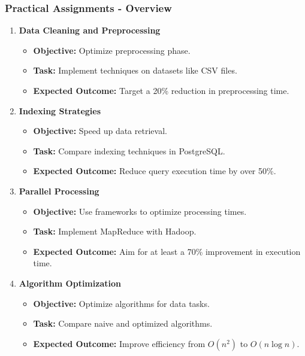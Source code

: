 \documentclass[aspectratio=169]{beamer}
\begin{document}
\begin{frame}[fragile]
    \frametitle{Practical Assignments - Overview}
    \begin{enumerate}
        \item \textbf{Data Cleaning and Preprocessing}
            \begin{itemize}
                \item \textbf{Objective:} Optimize preprocessing phase.
                \item \textbf{Task:} Implement techniques on datasets like CSV files.
                \item \textbf{Expected Outcome:} Target a 20\% reduction in preprocessing time.
            \end{itemize}
        
        \item \textbf{Indexing Strategies}
            \begin{itemize}
                \item \textbf{Objective:} Speed up data retrieval.
                \item \textbf{Task:} Compare indexing techniques in PostgreSQL.
                \item \textbf{Expected Outcome:} Reduce query execution time by over 50\%.
            \end{itemize}

        \item \textbf{Parallel Processing}
            \begin{itemize}
                \item \textbf{Objective:} Use frameworks to optimize processing times.
                \item \textbf{Task:} Implement MapReduce with Hadoop.
                \item \textbf{Expected Outcome:} Aim for at least a 70\% improvement in execution time.
            \end{itemize}

        \item \textbf{Algorithm Optimization}
            \begin{itemize}
                \item \textbf{Objective:} Optimize algorithms for data tasks.
                \item \textbf{Task:} Compare naive and optimized algorithms.
                \item \textbf{Expected Outcome:} Improve efficiency from $O(n^2)$ to $O(n \log n)$.
            \end{itemize}
    \end{enumerate}
\end{frame}
\end{document}
